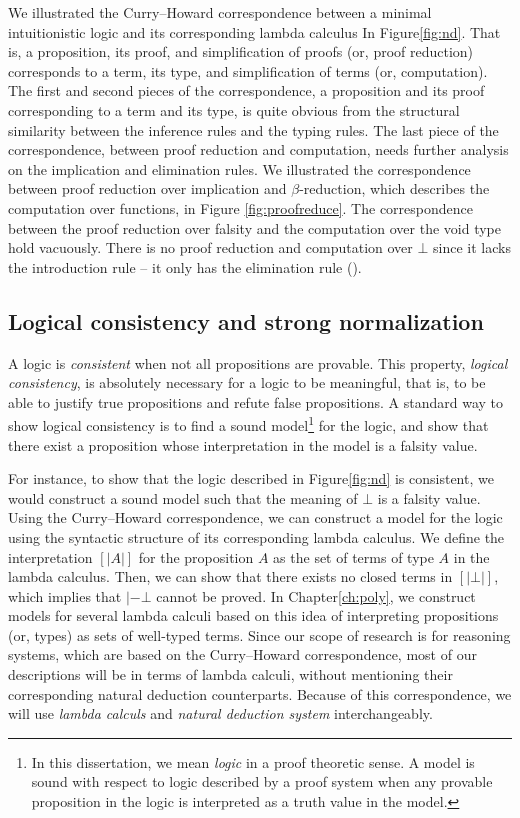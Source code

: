 We illustrated the Curry--Howard correspondence between
a minimal intuitionistic logic and its corresponding lambda calculus
In Figure\;\ref{fig:nd}. That is, a proposition, its proof, and
simplification of proofs (or, proof reduction) corresponds to
a term, its type, and simplification of terms (or, computation).
The first and second pieces of the correspondence, a proposition and
its proof corresponding to a term and its type, is quite obvious from
the structural similarity between the inference rules and the typing rules.
The last piece of the correspondence, between proof reduction and computation,
needs further analysis on the implication and elimination rules.
We illustrated the correspondence between proof reduction over implication
and $\beta$-reduction, which describes the computation over functions,
in Figure \ref{fig:proofreduce}. The correspondence between
the proof reduction over falsity and the computation over the void type
hold vacuously. There is no proof reduction and computation over $\bot$
since it lacks the introduction rule -- it only has the elimination rule
().

\subsection{Logical consistency and strong normalization}
A logic is \emph{consistent} when not all propositions are provable.
This property, \emph{logical consistency}, is absolutely necessary for
a logic to be meaningful, that is, to be able to justify true propositions
and refute false propositions. A standard way to show logical consistency
is to find a sound model\footnote{In this dissertation, we mean \emph{logic}
        in a proof theoretic sense. A model is sound with respect to logic
        described by a proof system when any provable proposition
        in the logic is interpreted as a truth value in the model.}
for the logic, and show that there exist a proposition whose interpretation
in the model is a falsity value.

For instance, to show that the logic described in Figure\;\ref{fig:nd}
is consistent, we would construct a sound model such that the meaning of
$\bot$ is a falsity value. Using the Curry--Howard correspondence,
we can construct a model for the logic using the syntactic structure of its
corresponding lambda calculus. We define the interpretation $[|A|]$ for
the proposition $A$ as the set of terms of type $A$ in the lambda calculus.
Then, we can show that there exists no closed terms in $[|\bot|]$,
which implies that $|- \bot$ cannot be proved. In Chapter\;\ref{ch:poly},
we construct models for several lambda calculi based on this idea of
interpreting propositions (or, types) as sets of well-typed terms.
Since our scope of research is for reasoning systems, which are based on
the Curry--Howard correspondence, most of our descriptions will be in terms of
lambda calculi, without mentioning their corresponding natural deduction
counterparts. Because of this correspondence, we will use \emph{lambda calculs}
and \emph{natural deduction system} interchangeably.

